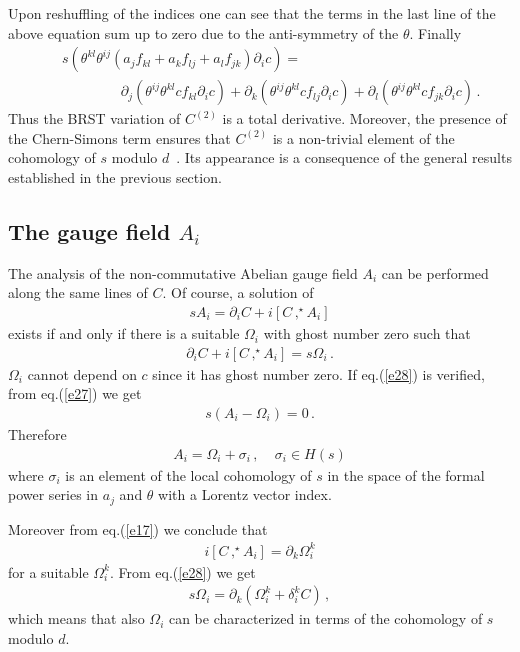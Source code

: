 \documentclass[a4paper,12pt]{article}
\newcommand{\starcomm}[2]{[ #1 \, ,^{\!\!\star} #2 ]}
\begin{document}
%
Upon reshuffling of the indices one can see that the terms in the last
 line of the above equation sum up to zero due to the anti-symmetry of the
 $\theta$.
Finally
%
\begin{eqnarray}
&& s \left ( \theta^{kl}\theta^{ij} (a_j f_{kl}
+a_k f_{lj} + a_l f_{jk}) \partial_i c \right )  = \nonumber \\
&& ~~~~~~~~~~~~~~~~~~~ 
\partial_j (\theta^{ij} \theta^{kl} c f_{kl} \partial_i c) +
\partial_k (\theta^{ij} \theta^{kl} c f_{lj} \partial_i c) +
\partial_l (\theta^{ij} \theta^{kl} c f_{jk} \partial_i c) \, .
\label{e26}
\end{eqnarray}
%
Thus the BRST variation of $C^{(2)}$ is a total derivative.
Moreover, the presence of the Chern-Simons term ensures that $C^{(2)}$ is
a non-trivial element of the cohomology of $s$ modulo
 $d$~\cite{Barnich:2000zw}.
Its appearance is a consequence of the general results established in the
 previous section.

\subsection{The gauge field $A_i$}

The analysis of the non-commutative Abelian gauge field $A_i$ can be
 performed along the same lines of $C$.
Of course, a solution of
%
\begin{eqnarray}
s A_i = \partial_i C + i \starcomm{C}{A_i}
\label{e27}
\end{eqnarray}
%
exists if and only if there is a suitable $\Omega_i$ with ghost number 
 zero such that
%
\begin{eqnarray}
\partial_i C + i \starcomm{C}{A_i} = s \Omega_i \, .
\label{e28}
\end{eqnarray}
%
$\Omega_i$ cannot depend on $c$ since it has ghost number zero.
If eq.(\ref{e28}) is verified, from eq.(\ref{e27}) we get
%
\begin{eqnarray}
s ( A_i - \Omega_i) = 0 \, .
\label{e29}
\end{eqnarray}
%
Therefore 
%
\begin{eqnarray}
A_i = \Omega_i + \sigma_i \, , ~~~~~\sigma_i \in H(s) 
\label{e30}
\end{eqnarray}
%
where $\sigma_i$ is an element of the local cohomology of $s$ in the space
of the formal power series in $a_j$ and $\theta$ with a Lorentz vector
index.

Moreover from eq.(\ref{e17}) we conclude that
%
\begin{eqnarray}
i \starcomm{C}{A_i} = \partial_k \Omega^k_i 
\label{e31}
\end{eqnarray}
%
for a suitable $\Omega^k_i$. From eq.(\ref{e28}) we
get
%
\begin{eqnarray}
s \Omega_i = \partial_k (\Omega^k_i + \delta^k_i C) \, ,
\label{e32}
\end{eqnarray}
%
which means that also $\Omega_i$ can be characterized in terms of the
 cohomology of $s$ modulo $d$.
\end{document}
